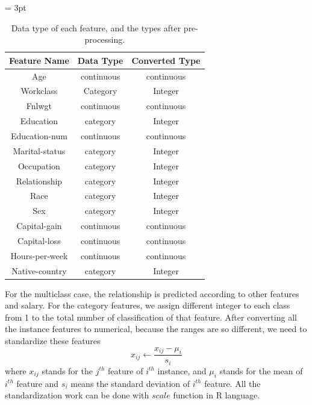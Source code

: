 \documentclass[11pt,letterpaper]{article}
\begin{document}
\begin{table}[!htbp]
\caption{\small Data type of each feature, and the types after pre-processing.}

\tabcolsep = 3pt
\begin{center}
\label{tab:dataset}
\begin{small}
\begin{tabular}[c]{|c|c|c|}
\hline
Feature Name & Data Type & Converted Type \\
\hline
%
Age & continuous & continuous\\
\hline
Workclass & Category & Integer\\
%
\hline
Fnlwgt & continuous & continuous \\
\hline
Education & category & Integer \\
\hline
Education-num & continuous & continuous \\
\hline
Marital-status & category & Integer \\
\hline
Occupation & category & Integer \\
\hline
Relationship & category & Integer \\
\hline
Race & category & Integer \\
\hline
Sex & category & Integer \\
\hline
Capital-gain & continuous & continuous \\
\hline
Capital-loss & continuous & continuous \\
\hline
Hours-per-week & continuous & continuous \\
\hline
Native-country & category & Integer \\

\hline
\end{tabular}
\end{small}
\end{center}
\end{table}

For the multiclass case, the relationship is predicted according to other features and salary. For the category features, we assign different integer to each class from 1 to the total number of classification of that feature. After converting all the instance features to numerical, because the ranges are so different, we need to standardize these features
\begin{equation}
\label{eqn:std}
x_{ij} \gets \frac{x_{ij}-\mu_i}{s_i}
\end{equation}
where $x_{ij}$ stands for the $j^{th}$ feature of $i^{th}$ instance, and $\mu_i$ stands for the mean of $i^{th}$ feature and $s_i$ means the standard deviation of $i^{th}$ feature. All the standardization work can be done with $scale$ function in R language.
\end{document}
